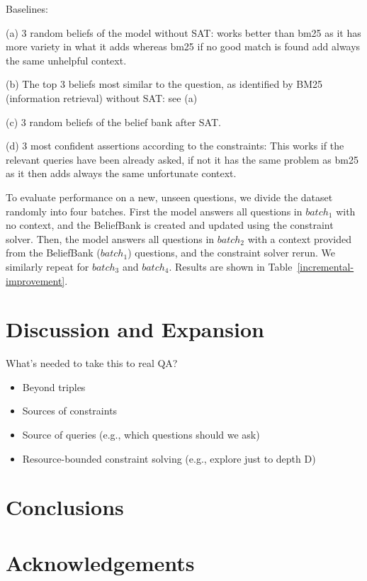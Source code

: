 \documentclass[11pt]{article}
\newenvironment{ite}{                     %
     \parskip 0cm \begin{itemize} \parskip 0cm \parsep 0cm \itemsep 0cm \topsep 0cm}{
        \end{itemize}} %
\newenvironment{des}{                 %
     \parskip 0cm \begin{list}{}{\parsep 0cm \itemsep 0cm \topsep 0cm}}{
       \end{list}} %
\begin{document}
Baselines:
\begin{des}
\item[(a)] 3 random beliefs of the model without SAT: works better than bm25 as it has more variety in what it adds whereas bm25 if no good match is found add always the same unhelpful context.
\item[(b)] The top 3 beliefs most similar to the question, as identified by BM25 (information retrieval) without SAT: see (a)
\item[(c)] 3 random beliefs of the belief bank after SAT.
\item[(d)] 3 most confident assertions according to the constraints: This works if the relevant queries have been already asked, if not it has the same problem as bm25 as it then adds always the same unfortunate context.
\end{des}

To evaluate performance on a new, unseen questions,
we divide the dataset randomly into four batches.
First the model answers all questions in $batch_1$ with no context, and the BeliefBank
is created and updated using the constraint solver. Then, the model answers all
questions in $batch_2$ with a context provided from the BeliefBank ($batch_1$) questions,
and the constraint solver rerun. We similarly repeat for $batch_3$ and $batch_4$.
Results are shown in Table~\ref{incremental-improvement}.

\section{Discussion and Expansion}

What's needed to take this to real QA? 
\begin{ite}
\item Beyond triples
\item Sources of constraints
\item Source of queries (e.g., which questions should we ask)
\item Resource-bounded constraint solving (e.g., explore just to depth D)
\end{ite}

\section{Conclusions}

\section*{Acknowledgements}




\end{document}
